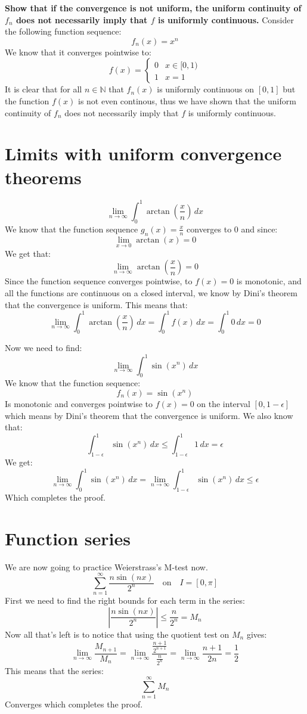 \documentclass{article}
\theoremstyle{plain}
\newcommand{\N}{\mathbb{N}}
\begin{document}
	\textbf{Show that if the convergence is not uniform, the uniform
	continuity of $f_n$ does not necessarily imply that $f$ is uniformly
	continuous.}
	Consider the following function sequence: 
	\[
		f_n(x) = x^n
	\]
	We know that it converges pointwise to:
	\[
	f(x) = 
		\begin{cases}
			0 & x\in[0,1) \\
			1 & x = 1
		\end{cases} 
	\]
	It is clear that for all $n\in\N$ that $f_n(x)$ is uniformly continuous
	on $[0,1]$ but the function $f(x)$ is not even continous, thus we 
	have shown that the uniform continuity of $f_n$ does not necessarily 
	imply that $f$ is uniformly continuous.
	
	\newpage
	
	\section{Limits with uniform convergence theorems}
	\[
		\lim_{n\to\infty}{\int_{0}^{1}{\arctan\left(\frac{x}{n}\right)\,dx}}
	\]
	We know that the function sequence $g_n(x) = \frac{x}{n}$ converges 
	to $0$ and since:
	\[
		\lim_{x\to 0}{\arctan(x)} = 0
	\]
	We get that:
	\[
		\lim_{n\to\infty}{\arctan\left(\frac{x}{n}\right)} = 0
	\]
	Since the function sequence converges pointwise, to $f(x) = 0$ is 
	monotonic, and all the functions are continuous on a closed interval, 
	we know by Dini's theorem that the convergence is uniform. 
	This means that:
	\[
		\lim_{n\to\infty}{\int_{0}^{1}{\arctan\left(\frac{x}{n}\right)\,dx}}
		= \int_{0}^{1}{f(x)\,dx} = \int_{0}^{1}{0\,dx} = 0
	\]
	
	\newpage
	
	Now we need to find:
	\[
		\lim_{n\to\infty}{\int_{0}^{1}{\sin(x^n)\,dx}}
	\]
	We know that the function sequence:
	\[
		f_n(x) = \sin(x^n)
	\]
	Is monotonic and converges pointwise to $f(x) = 0$ on the interval
	$[0,1-\epsilon]$ which means by Dini's theorem that the convergence is
	uniform. We also know that:
	\[
		{\int_{1-\epsilon}^{1}{\sin(x^n)\,dx}} \le 
		{\int_{1-\epsilon}^{1}{1\,dx}} = \epsilon
	\]
	We get:
	\[
		\lim_{n\to\infty}{\int_{0}^{1}{\sin(x^n)\,dx}} = 
		\lim_{n\to\infty}\int_{1-\epsilon}^{1}{\sin(x^n)\,dx} \le
		\epsilon
	\]
	Which completes the proof.
	
	\newpage
	
	\section{Function series}
	We are now going to practice Weierstrass's M-test now.
	\[
	\sum_{n=1}^{\infty}{\frac{n\sin(nx)}{2^n}}\quad\text{on}\quad I=[0,\pi]
	\]
	First we need to find the right bounds for each term in the series:
	\[
		\left\vert\frac{n\sin(nx)}{2^n}\right\vert \le \frac{n}{2^n} = M_n
	\]
	Now all that's left is to notice that using the quotient test on $M_n$
	gives:
	\[
		\lim_{n\to\infty}{\frac{M_{n+1}}{M_{n}}} = 
		\lim_{n\to\infty}{\dfrac{\frac{n+1}{2^{n+1}}}{\frac{n}{2^n}}} = 
		\lim_{n\to\infty}{\frac{n+1}{2n}} = \frac{1}{2}
	\]
	This means that the series:
	\[
		\sum_{n=1}^{\infty}{M_n}
	\]
	Converges which completes the proof.
	
\end{document}
